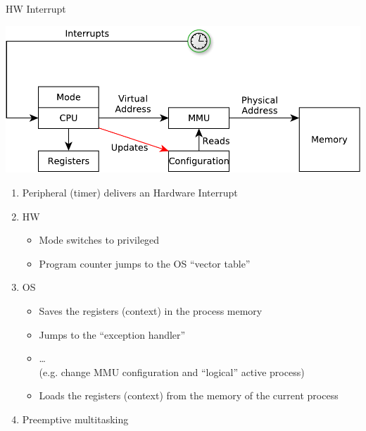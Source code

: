 \documentclass{beamer}
\begin{document}
\begin{frame}{HW Interrupt}
  \begin{center}
  \includegraphics[width=0.5\linewidth]{timer}
  \end{center}
  \begin{enumerate}
  \item<1-> Peripheral (timer) delivers an Hardware Interrupt
  \item<2-> HW
  \begin{itemize}
    \item Mode switches to privileged
    \item Program counter jumps to the OS ``vector table''
  \end{itemize}
  \item<3-> OS
  \begin{itemize}
    \item Saves the registers (context) in the process memory
    \item Jumps to the ``exception handler''
    \item \dots \\
 (e.g. change MMU configuration and ``logical'' active process)
    \item Loads the registers (context) from the memory of the  \alert{current}
      process
  \end{itemize}
  \item Preemptive multitasking
\end{enumerate}
\end{frame}
\end{document}
